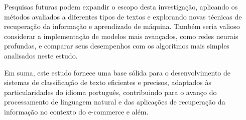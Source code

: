 Pesquisas futuras podem expandir o escopo desta investigação, aplicando os métodos avaliados a diferentes tipos de textos e explorando novas técnicas de recuperação da informação e aprendizado de máquina. Também seria valioso considerar a implementação de modelos mais avançados, como redes neurais profundas, e comparar seus desempenhos com os algoritmos mais simples analisados neste estudo.

Em suma, este estudo fornece uma base sólida para o desenvolvimento de sistemas de classificação de texto eficientes e precisos, adaptados às particularidades do idioma português, contribuindo para o avanço do processamento de linguagem natural e das aplicações de recuperação da informação no contexto do e-commerce e além.









